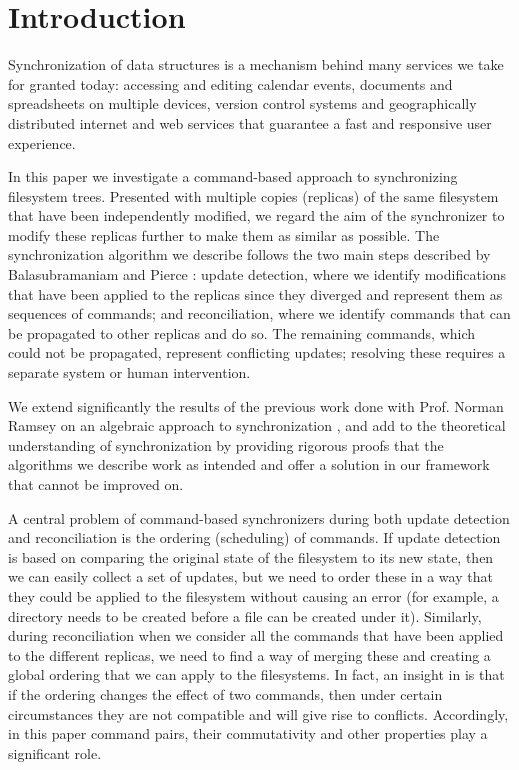 
\section{Introduction}

Synchronization of data structures
is a mechanism behind many services we take for granted today:
accessing and editing calendar events, documents and spreadsheets
on multiple devices, version control systems and
geographically distributed internet and web services that
guarantee a fast and responsive user experience.

In this paper we investigate a command-based approach
to synchronizing filesystem trees.
Presented with multiple copies (replicas) of the same filesystem that have been independently modified,
we regard the aim of the synchronizer to modify these replicas further
to make them as similar as possible.
The synchronization algorithm we describe
follows the two main steps described by Balasubramaniam and Pierce \cite{BP}:
update detection, where we identify modifications that have been applied to the replicas
since they diverged and represent them as sequences of commands;
and reconciliation, where we identify commands that can be propagated to other replicas and do so.
The remaining commands, which could not be propagated, represent conflicting updates;
resolving these requires a separate system or human intervention.

We extend significantly the results of the previous work done
with Prof. Norman Ramsey
on an algebraic approach to synchronization
\cite{NREC},
and add to the theoretical understanding
of synchronization by providing rigorous proofs that the algorithms
we describe work as intended
and offer a solution in our framework that cannot be improved on.

A central problem of command-based synchronizers 
during both update detection and reconciliation
is the ordering (scheduling) of commands.
If update detection is based on comparing the original state of the filesystem
to its new state, then we can easily collect a set of updates,
but we need to order these in a way that they could be applied
to the filesystem without causing an error 
(for example, a directory needs to be created before a file can be created under it).
Similarly, during reconciliation when we consider all the commands that
have been applied to the different replicas, we need to find a way of
merging these and creating a global ordering that we can apply
to the filesystems.
In fact, an insight in \cite{NREC} is that
if the ordering changes the effect of two commands,
then under certain circumstances they are not compatible and will give rise to conflicts.
Accordingly, in this paper command pairs, their commutativity and other properties
play a significant role.

